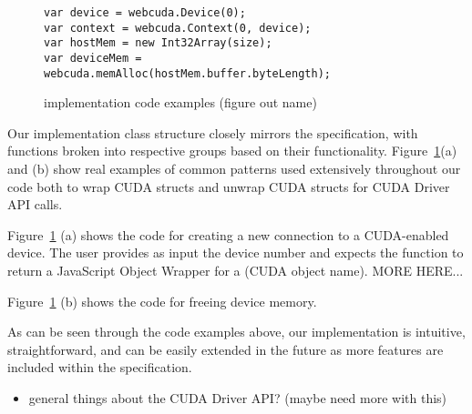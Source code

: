 \begin{figure}
	\begin{center}
\begin{lstlisting}[frame=single]
var device = webcuda.Device(0);
var context = webcuda.Context(0, device);
var hostMem = new Int32Array(size);
var deviceMem = webcuda.memAlloc(hostMem.buffer.byteLength);
\end{lstlisting}
\end{center}
\caption{implementation code examples (figure out name)}
\label{v8code}
\end{figure}

Our implementation class structure closely mirrors the specification, with
functions broken into respective groups based on their functionality.
Figure~\ref{v8code}(a) and (b) show real examples of common patterns used
extensively throughout our code both to wrap CUDA structs and unwrap CUDA
structs for CUDA Driver API calls.  

Figure~\ref{v8code} (a) shows the code for creating a new connection to a
CUDA-enabled device. The user provides as input the device number and expects
the function to return a JavaScript Object Wrapper for a (CUDA object name).
MORE HERE...

Figure~\ref{v8code} (b) shows the code for freeing device memory.

As can be seen through the code examples above, our implementation is intuitive,
straightforward, and can be easily extended in the future as more features are
included within the \name specification.


\begin{itemize}

	\item general things about the CUDA Driver API? (maybe need more with this)

\end{itemize}




